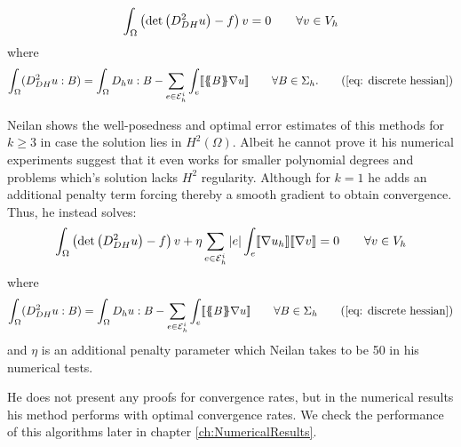 \begin{align}
		\int_\Omega \left(\det{\left(D_{DH}^2 u\right)} - f \right) v = 0 \qquad \forall v \in V_h \label{eq: neilan eq1}
\end{align}
where
	\begin{align}
		\int_\Omega (D_{DH}^2 u : B) 
		= \int_\Omega D_h u: B -\sum_{ e \in \edgesi} \int_e  \jump {\average B \nabla u }\qquad \forall B \in \Sigma_h. \tag{\ref{eq: discrete hessian}}
	\end{align}

Neilan shows the well-posedness and optimal error estimates of this methods for $k \geq 3$ in case the solution lies in $H^2(\Omega)$. Albeit he cannot prove it his numerical experiments suggest that it even works for smaller polynomial degrees and problems which's solution lacks $H^2$ regularity. Although for $k=1$ he adds an additional penalty term forcing thereby a smooth gradient to obtain convergence. Thus, he instead solves:
\begin{align}
		\int_\Omega \left(\det{\left(D_{DH}^2 u\right)} - f \right) v + \eta \sum_{e \in \mathcal{E}_h^i} |e| \int_e \llbracket  \nabla u_h \rrbracket \llbracket \nabla v \rrbracket
		= 0 \qquad \forall v \in V_h \label{eq: neilan eq1 + jump}
\end{align}
where
	\begin{align*}
		\int_\Omega (D_{DH}^2 u : B) 
		= \int_\Omega D_h u: B -\sum_{ e \in \edgesi} \int_e  \jump {\average B \nabla u }\qquad \forall B \in \Sigma_h \tag{\ref{eq: discrete hessian}}
	\end{align*}
and $\eta$ is an additional penalty parameter which Neilan takes to be 50 in his numerical tests.

He does not present any proofs for convergence rates, but in the numerical results his method performs with optimal convergence rates. We check the performance of this algorithms later in chapter \ref{ch:NumericalResults}.